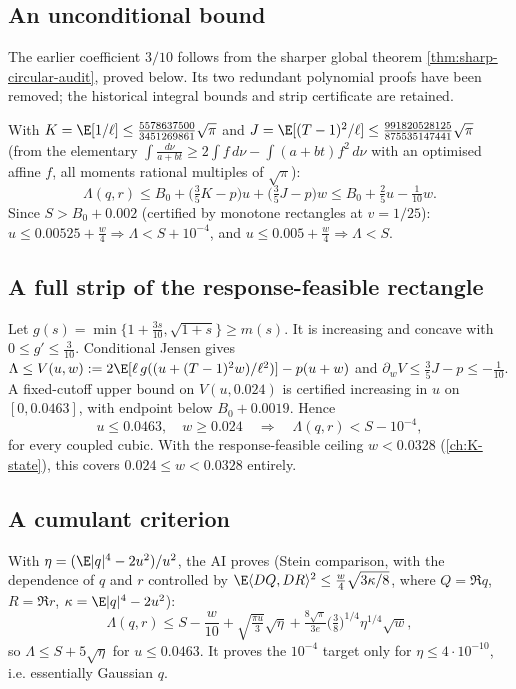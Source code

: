 \subsection{An unconditional bound}
The earlier coefficient $3/10$ follows from the sharper global theorem
\ref{thm:sharp-circular-audit}, proved below. Its two redundant polynomial
proofs have been removed; the historical integral bounds and strip
certificate are retained.

With $K=\E[1/\ell]\le\frac{5578637500}{3451269861}\sqrt\pi$ and $J=\E[(T-1)^2/\ell]\le\frac{991820528125}{875535147441}\sqrt\pi$ (from the elementary
$\int\frac{d\nu}{a+bt}\ge2\int f\,d\nu-\int(a+bt)f^2\,d\nu$ with an optimised affine $f$, all moments rational multiples of $\sqrt\pi$):
\[
\boxed{\Lambda(q,r)\le B_0+\bigl(\tfrac35K-p\bigr)u+\bigl(\tfrac35J-p\bigr)w\le B_0+\tfrac25u-\tfrac1{10}w.}
\]
Since $S>B_0+0.002$ (certified by monotone rectangles at $v=1/25$): $u\le0.00525+\frac w4\Rightarrow\Lambda<S+10^{-4}$, and $u\le0.005+\frac w4\Rightarrow\Lambda<S$.

\subsection{A full strip of the response-feasible rectangle}
Let $g(s)=\min\{1+\frac{3s}{10},\sqrt{1+s}\}\ge m(s)$. It is increasing and concave with $0\le g'\le\frac3{10}$. Conditional Jensen gives
$\Lambda\le V(u,w):=2\E[\ell\,g((u+(T-1)^2w)/\ell^2)]-p(u+w)$ and $\partial_wV\le\frac35J-p\le-\frac1{10}$. A fixed-cutoff upper bound on $V(u,0.024)$ is
certified increasing in $u$ on $[0,0.0463]$, with endpoint below $B_0+0.0019$. Hence
\[
\boxed{u\le0.0463,\quad w\ge0.024\quad\Longrightarrow\quad\Lambda(q,r)<S-10^{-4},}
\]
for every coupled cubic. With the response-feasible ceiling $w<0.0328$ (\autoref{ch:K-state}), this covers $0.024\le w<0.0328$ entirely.

\subsection{A cumulant criterion}\label{sec:sar-cumulant}
With $\eta=(\E|q|^4-2u^2)/u^2$, the AI proves (Stein comparison, with the dependence of $q$ and $r$ controlled by
$\E\langle DQ,DR\rangle^2\le\frac w4\sqrt{3\kappa/8}$, where $Q=\Re q$, $R=\Re r$, $\kappa=\E|q|^4-2u^2$):
\[
\Lambda(q,r)\le S-\frac w{10}+\sqrt{\tfrac{\pi u}3}\sqrt\eta+\tfrac{8\sqrt\pi}{3e}\bigl(\tfrac38\bigr)^{1/4}\eta^{1/4}\sqrt w,
\]
so $\Lambda\le S+5\sqrt\eta$ for $u\le0.0463$. It proves the $10^{-4}$ target only for $\eta\le4\cdot10^{-10}$, i.e. essentially Gaussian $q$.

